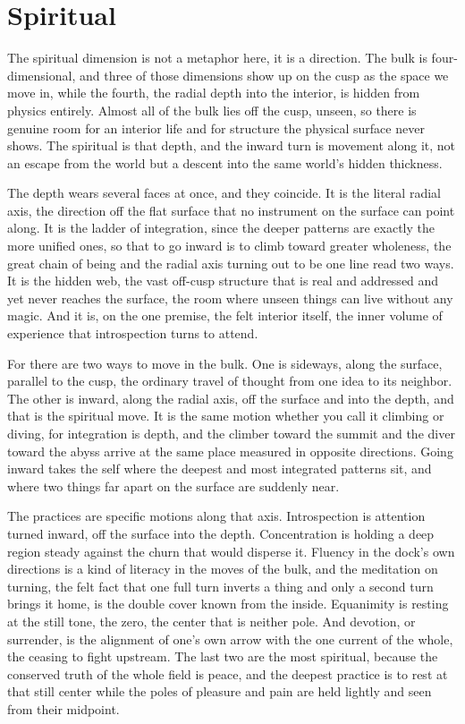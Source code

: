 \section{Spiritual}

The spiritual dimension is not a metaphor here, it is a direction. The bulk is four-dimensional, and three of those dimensions show up on the cusp as the space we move in, while the fourth, the radial depth into the interior, is hidden from physics entirely. Almost all of the bulk lies off the cusp, unseen, so there is genuine room for an interior life and for structure the physical surface never shows. The spiritual is that depth, and the inward turn is movement along it, not an escape from the world but a descent into the same world's hidden thickness.

The depth wears several faces at once, and they coincide. It is the literal radial axis, the direction off the flat surface that no instrument on the surface can point along. It is the ladder of integration, since the deeper patterns are exactly the more unified ones, so that to go inward is to climb toward greater wholeness, the great chain of being and the radial axis turning out to be one line read two ways. It is the hidden web, the vast off-cusp structure that is real and addressed and yet never reaches the surface, the room where unseen things can live without any magic. And it is, on the one premise, the felt interior itself, the inner volume of experience that introspection turns to attend.

For there are two ways to move in the bulk. One is sideways, along the surface, parallel to the cusp, the ordinary travel of thought from one idea to its neighbor. The other is inward, along the radial axis, off the surface and into the depth, and that is the spiritual move. It is the same motion whether you call it climbing or diving, for integration is depth, and the climber toward the summit and the diver toward the abyss arrive at the same place measured in opposite directions. Going inward takes the self where the deepest and most integrated patterns sit, and where two things far apart on the surface are suddenly near.

The practices are specific motions along that axis. Introspection is attention turned inward, off the surface into the depth. Concentration is holding a deep region steady against the churn that would disperse it. Fluency in the dock's own directions is a kind of literacy in the moves of the bulk, and the meditation on turning, the felt fact that one full turn inverts a thing and only a second turn brings it home, is the double cover known from the inside. Equanimity is resting at the still tone, the zero, the center that is neither pole. And devotion, or surrender, is the alignment of one's own arrow with the one current of the whole, the ceasing to fight upstream. The last two are the most spiritual, because the conserved truth of the whole field is peace, and the deepest practice is to rest at that still center while the poles of pleasure and pain are held lightly and seen from their midpoint.

